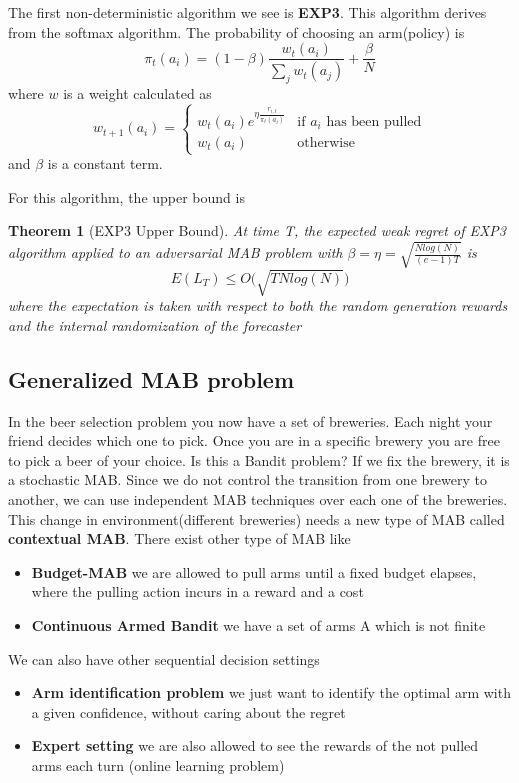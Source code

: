 \documentclass[main.tex]{subfiles}
\newtheorem{theorem}{Theorem}[section]
\begin{document}
The first non-deterministic algorithm we see is \textbf{EXP3}.
This algorithm derives from the softmax algorithm.
The probability of choosing an arm(policy) is
\begin{equation}
    \pi_t(a_i) = (1-\beta) \frac{w_t(a_i)}{\sum_j w_t(a_j)} + \frac{\beta}{N}
\end{equation}
where $w$ is a weight calculated as
\begin{equation*}
    w_{t+1}(a_i) =
    \begin{cases}
    w_t(a_i)e^{\eta \frac{r_{i,t}}{\pi_t(a_i)}} & \text{if $a_i$ has been pulled} \\
    w_t(a_i) & \text{otherwise}
    \end{cases}
\end{equation*}
and $\beta$ is a constant term.
\par \noindent
For this algorithm, the upper bound is
\begin{theorem}[EXP3 Upper Bound]
At time T, the expected weak regret of EXP3 algorithm applied to an adversarial MAB problem with $\beta = \eta = \sqrt{\frac{Nlog(N)}{(e-1)T}}$ is
\begin{equation*}
    E(L_T) \leq O\big( \sqrt{TNlog(N)} \big)
\end{equation*}
where the expectation is taken with respect to both the random generation rewards and the internal randomization of the forecaster
\end{theorem}

\subsection{Generalized MAB problem}
In the beer selection problem you now have a set of breweries. Each night your friend decides which one to pick. Once you are in a specific brewery you are free to pick a beer of your choice.
Is this a Bandit problem?
If we fix the brewery, it is a stochastic MAB. Since we do not control the transition from one brewery to another, we can use independent MAB techniques over each one of the breweries. This change in environment(different breweries) needs a new type of MAB called \textbf{contextual MAB}. There exist other type of MAB like
\begin{itemize}
    \item \textbf{Budget-MAB} we are allowed to pull arms until a fixed budget elapses, where the pulling action incurs in a reward and a cost
    \item \textbf{Continuous Armed Bandit} we have a set of arms A which is not finite
\end{itemize}
We can also have other sequential decision settings
\begin{itemize}
    \item \textbf{Arm identification problem} we just want to identify the optimal arm with a given confidence, without caring about the regret
    \item \textbf{Expert setting} we are also allowed to see the rewards of the not pulled arms each turn (online learning problem)
\end{itemize}
\end{document}
